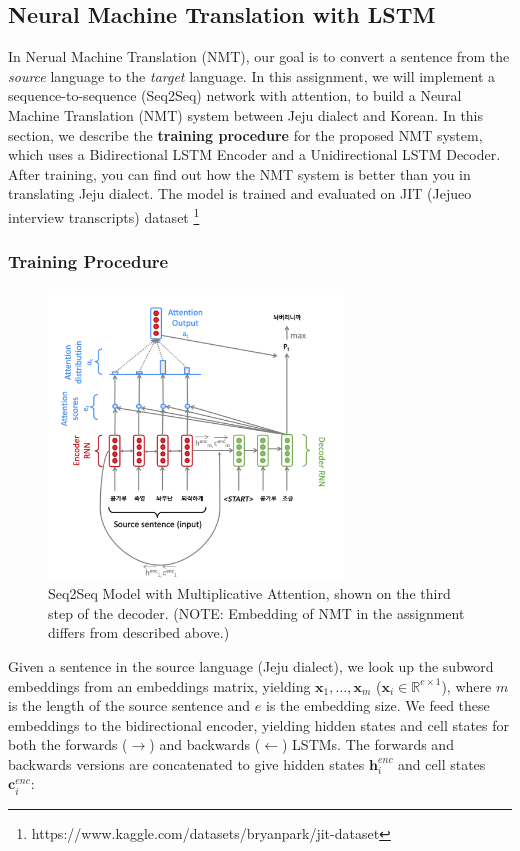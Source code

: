 \documentclass{assignment format}
\begin{document}
\subsection{Neural Machine Translation with LSTM}

 In Nerual Machine Translation (NMT), our goal is to convert a sentence from the \textit{source} language to the \textit{target} language. In this assignment, we will implement a sequence-to-sequence (Seq2Seq) network with attention, to build a Neural Machine Translation (NMT) system between Jeju dialect and Korean. In this section, we describe the \textbf{training procedure} for the proposed NMT system, which uses a Bidirectional LSTM Encoder and a Unidirectional LSTM Decoder. After training, you can find out how the NMT system is better than you in translating Jeju dialect. The model is trained and evaluated on JIT (Jejueo interview transcripts) dataset \footnote{https://www.kaggle.com/datasets/bryanpark/jit-dataset}
 \subsubsection{Training Procedure}
\begin{figure}[h]
    \begin{center}
        \captionsetup{width=0.8\textwidth}
        \includegraphics[width=0.7\textwidth]{nmt.png}
        \caption{Seq2Seq Model with Multiplicative Attention, shown on the third step of the decoder.  (NOTE: Embedding of NMT in the assignment differs from described above.)
        }
        \label{nmt-figure}
    \end{center}
\end{figure}
Given a sentence in the source language (Jeju dialect), we look up the subword embeddings from an embeddings matrix, yielding $\mathbf{x}_1, \dots, \mathbf{x}_m$ ($\mathbf{x}_i \in \mathbb{R}^{e \times 1}$), where $m$ is the length of the source sentence and $e$ is the embedding size. We feed these embeddings to the bidirectional encoder, yielding hidden states and cell states for both the forwards ($\rightarrow$) and backwards ($\leftarrow$) LSTMs. The forwards and backwards versions are concatenated to give hidden states $\mathbf{h}^{enc}_i$ and cell states $\mathbf{c}^{enc}_i$:
\end{document}
